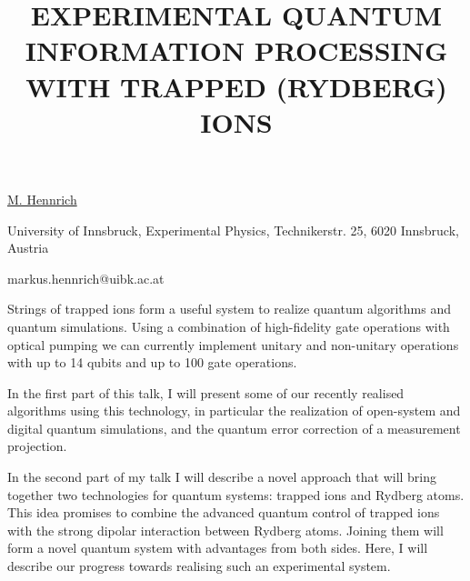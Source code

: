 \title{EXPERIMENTAL QUANTUM INFORMATION PROCESSING WITH TRAPPED (RYDBERG) IONS}

\underline{M. Hennrich} 

{\normalsize{\vspace{-4mm}
University of Innsbruck,
Experimental Physics,
Technikerstr. 25,
6020 Innsbruck,
Austria

\email markus.hennrich@uibk.ac.at}}

Strings of trapped ions form a useful system to realize quantum algorithms and quantum simulations. Using a combination of high-fidelity gate operations with optical pumping we can currently implement unitary and non-unitary operations with up to 14 qubits and up to 100 gate operations.

In the first part of this talk, I will present some of our recently realised algorithms using this technology, in particular the realization of open-system and digital quantum simulations, and the quantum error correction of a measurement projection.

In the second part of my talk I will describe a novel approach that will bring together two technologies for quantum systems: trapped ions and Rydberg atoms. This idea promises to combine the advanced quantum control of trapped ions with the strong dipolar interaction between Rydberg atoms. Joining them will form a novel quantum system with advantages from both sides. Here, I will describe our progress towards realising such an experimental system.

\vspace{\baselineskip}
